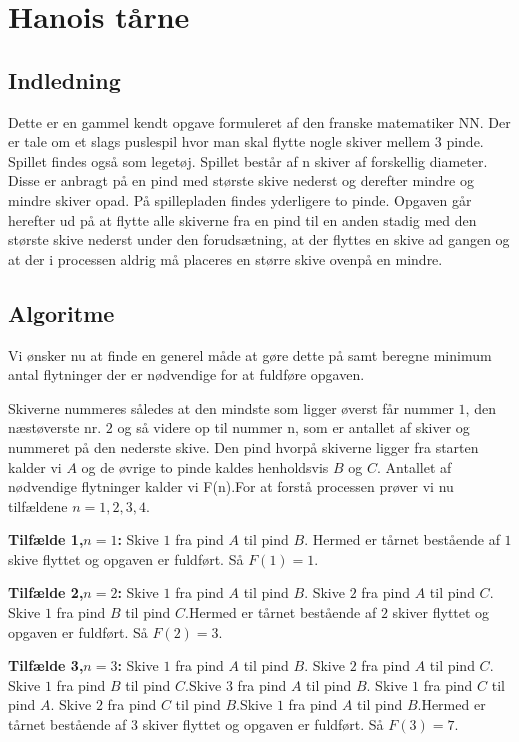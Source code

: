 \chapter{Hanois tårne}
\section{Indledning}
Dette er en gammel kendt opgave formuleret af den franske matematiker NN.
Der er tale om et slags puslespil hvor man skal flytte nogle skiver mellem
3 pinde. Spillet findes også som legetøj. Spillet består af n skiver af
forskellig diameter. Disse er anbragt på en pind med største skive nederst
og derefter mindre og mindre skiver opad. På spillepladen findes yderligere
to pinde. Opgaven går herefter ud på at flytte alle skiverne fra en pind
til en anden stadig med den største skive nederst under den forudsætning,
at der flyttes en skive ad gangen og at der  i processen aldrig må placeres
en større skive ovenpå en mindre.

\section{Algoritme}
Vi ønsker nu at finde en generel måde at gøre dette på samt beregne minimum
antal flytninger der er nødvendige for at fuldføre opgaven.

Skiverne nummeres således at den mindste som ligger øverst får nummer \(1
\), den næstøverste nr. \(2\) og så videre op til nummer n, som er antallet
af skiver og nummeret på den nederste skive.
Den pind hvorpå skiverne ligger fra starten kalder vi \(A\) og de øvrige to
pinde kaldes henholdsvis \(B\) og \(C\). Antallet af nødvendige flytninger
kalder vi F(n).For at forstå processen prøver vi nu tilfældene \(n=1,2,3,4\).

\noindent \textbf{Tilfælde 1,\(n=1\):} Skive \(1\) fra pind \(A\) til pind \(B\). Hermed er
tårnet bestående af \(1\) skive flyttet og opgaven er fuldført. Så \(F(1)=1
\).

\noindent \textbf{Tilfælde 2,\(n=2\):} Skive \(1\) fra pind \(A\) til pind \(B\). Skive \(2\)
fra pind \(A\) til pind \(C\). Skive \(1\) fra pind \(B\) til pind \(C
\).Hermed er tårnet bestående af \(2\) skiver flyttet og opgaven er
fuldført. Så \(F(2)=3\).

\noindent \textbf{Tilfælde 3,\(n=3\):} Skive \(1\) fra pind \(A\) til pind \(B\). Skive \(2\)
fra pind \(A\) til pind \(C\). Skive \(1\) fra pind \(B\) til pind \(C
\).Skive \(3\) fra pind \(A\) til pind \(B\). Skive \(1\) fra pind \(C\)
til pind \(A\). Skive \(2\) fra pind \(C\) til pind \(B\).Skive \(1\) fra
pind \(A\) til pind \(B\).Hermed er tårnet bestående af \(3\) skiver
flyttet og opgaven er fuldført. Så \(F(3)=7\).

